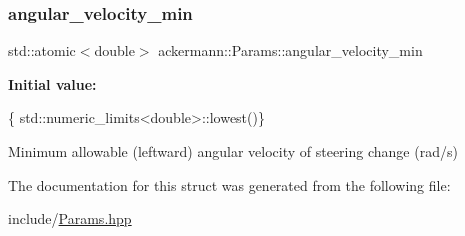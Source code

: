 \subsubsection{\texorpdfstring{angular\+\_\+velocity\+\_\+min}{angular\_velocity\_min}}
{\footnotesize\ttfamily std\+::atomic$<$double$>$ ackermann\+::\+Params\+::angular\+\_\+velocity\+\_\+min}

{\bfseries Initial value\+:}
\begin{DoxyCode}
\{
    std::numeric\_limits<double>::lowest()\}
\end{DoxyCode}


Minimum allowable (leftward) angular velocity of steering change (rad/s) 



The documentation for this struct was generated from the following file\+:\begin{DoxyCompactItemize}
\item 
include/\hyperlink{_params_8hpp}{Params.\+hpp}\end{DoxyCompactItemize}
